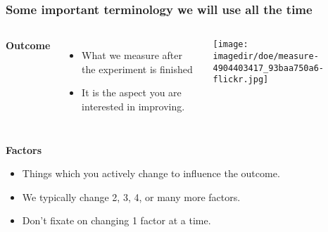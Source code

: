 \begin{frame}\frametitle{Some important terminology we will use all the time}
	
	\begin{columns}[T]
			\textbf{{\color{purple} Outcome}}
				\begin{itemize}
					\item	What we measure after the experiment is finished  \pause
					\item	It is the aspect you are interested in improving.\pause
			 
				\end{itemize}
		
			\centerline{\texttt{[image: \\imagedir/doe/measure-4904403417\_93baa750a6-flickr.jpg]}}

	\end{columns}
	
			
	\vspace{24pt}
	\textbf{{\color{purple} Factors}}
		\begin{itemize}
			\item	Things which you actively change to influence the outcome.
			\item	We typically change 2, 3, 4, or many more factors. \pause
			\item	Don't fixate on changing 1 factor at a time.
		\end{itemize}
	
	
\end{frame}
